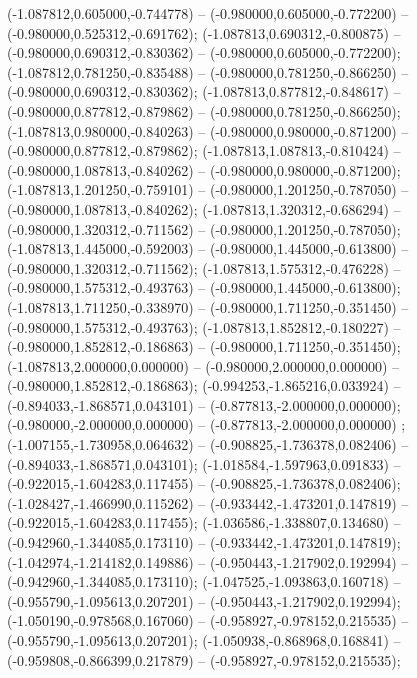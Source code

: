  (-1.087812,0.605000,-0.744778) -- (-0.980000,0.605000,-0.772200) -- (-0.980000,0.525312,-0.691762);
 (-1.087813,0.690312,-0.800875) -- (-0.980000,0.690312,-0.830362) -- (-0.980000,0.605000,-0.772200);
 (-1.087812,0.781250,-0.835488) -- (-0.980000,0.781250,-0.866250) -- (-0.980000,0.690312,-0.830362);
 (-1.087813,0.877812,-0.848617) -- (-0.980000,0.877812,-0.879862) -- (-0.980000,0.781250,-0.866250);
 (-1.087813,0.980000,-0.840263) -- (-0.980000,0.980000,-0.871200) -- (-0.980000,0.877812,-0.879862);
 (-1.087813,1.087813,-0.810424) -- (-0.980000,1.087813,-0.840262) -- (-0.980000,0.980000,-0.871200);
 (-1.087813,1.201250,-0.759101) -- (-0.980000,1.201250,-0.787050) -- (-0.980000,1.087813,-0.840262);
 (-1.087813,1.320312,-0.686294) -- (-0.980000,1.320312,-0.711562) -- (-0.980000,1.201250,-0.787050);
 (-1.087813,1.445000,-0.592003) -- (-0.980000,1.445000,-0.613800) -- (-0.980000,1.320312,-0.711562);
 (-1.087813,1.575312,-0.476228) -- (-0.980000,1.575312,-0.493763) -- (-0.980000,1.445000,-0.613800);
 (-1.087813,1.711250,-0.338970) -- (-0.980000,1.711250,-0.351450) -- (-0.980000,1.575312,-0.493763);
 (-1.087813,1.852812,-0.180227) -- (-0.980000,1.852812,-0.186863) -- (-0.980000,1.711250,-0.351450);
 (-1.087813,2.000000,0.000000) -- (-0.980000,2.000000,0.000000) -- (-0.980000,1.852812,-0.186863);
 (-0.994253,-1.865216,0.033924) -- (-0.894033,-1.868571,0.043101) -- (-0.877813,-2.000000,0.000000);
 (-0.980000,-2.000000,0.000000) -- (-0.877813,-2.000000,0.000000) ;
 (-1.007155,-1.730958,0.064632) -- (-0.908825,-1.736378,0.082406) -- (-0.894033,-1.868571,0.043101);
 (-1.018584,-1.597963,0.091833) -- (-0.922015,-1.604283,0.117455) -- (-0.908825,-1.736378,0.082406);
 (-1.028427,-1.466990,0.115262) -- (-0.933442,-1.473201,0.147819) -- (-0.922015,-1.604283,0.117455);
 (-1.036586,-1.338807,0.134680) -- (-0.942960,-1.344085,0.173110) -- (-0.933442,-1.473201,0.147819);
 (-1.042974,-1.214182,0.149886) -- (-0.950443,-1.217902,0.192994) -- (-0.942960,-1.344085,0.173110);
 (-1.047525,-1.093863,0.160718) -- (-0.955790,-1.095613,0.207201) -- (-0.950443,-1.217902,0.192994);
 (-1.050190,-0.978568,0.167060) -- (-0.958927,-0.978152,0.215535) -- (-0.955790,-1.095613,0.207201);
 (-1.050938,-0.868968,0.168841) -- (-0.959808,-0.866399,0.217879) -- (-0.958927,-0.978152,0.215535);

